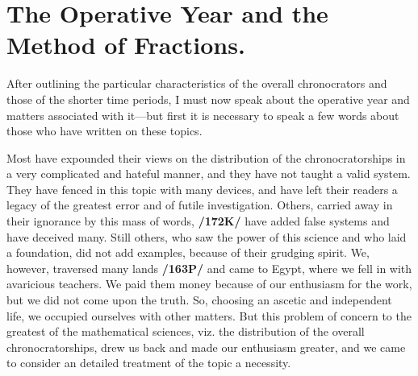 \section{The Operative Year and the Method of Fractions.}

After outlining the particular characteristics of the overall chronocrators and those of the shorter time periods, I must now speak about the operative year and matters associated with it—but first it is necessary to speak a few words about those who have written on these topics. 

Most have expounded their views on the distribution of the chronocratorships in a very complicated and hateful manner, and they have not taught
a valid system. They have fenced in this topic with many devices, and have left their readers a legacy of the greatest error and of futile investigation. Others, carried away in their ignorance by this mass of words, \textbf{/172K/} have added false systems and have deceived many. Still others, who saw the power of this science and who laid a foundation, did not add examples, because of their grudging spirit. We, however, traversed many lands \textbf{/163P/} and came to Egypt, where we fell in with avaricious teachers. We paid them money because of our enthusiasm for the work, but we did not come upon the truth. So, choosing an ascetic and independent life, we occupied ourselves with other matters. But this
problem of concern to the greatest of the mathematical sciences, viz. the distribution of the overall chronocratorships, drew us back and made our enthusiasm greater, and we came to consider an detailed treatment
of the topic a necessity.

